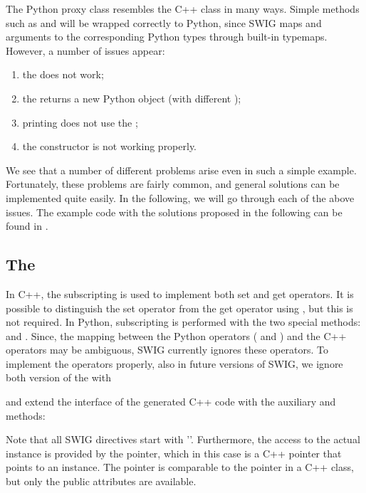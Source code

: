 The Python proxy class resembles the C++ class in many ways. Simple
methods such as  and  will be wrapped correctly
to Python, since SWIG maps  and  arguments to the
corresponding Python types through built-in typemaps.  However, a number
of issues appear:
\begin{enumerate}
\item the  does not work;

\item the  returns a new Python object (with different
);

\item printing does not use the ;

\item the  constructor is not working
properly.
\end{enumerate}
We see that a number of different problems arise even in such a simple
example. Fortunately, these problems are fairly common, and general
solutions can be implemented quite easily. In the following, we will go
through each of the above issues. The example code with the solutions
proposed in the following can be found in .

\subsection{The }
In C++, the subscripting  is used to implement
both set and get operators. It is possible to distinguish the set
operator from the get operator using , but this is not
required.  In Python, subscripting is performed with the two special
methods:  and .  Since,
the mapping between the Python operators ( and
) and the C++ operators  may be
ambiguous, SWIG currently ignores these operators.  To implement the
operators properly, also in future versions of SWIG, we ignore both
version of the  with
\begin{swigcode}
\end{swigcode}
and extend the interface of the generated C++ code with the auxiliary
 and  methods:
Note that all SWIG directives start with '\emp{\%}'.  Furthermore, the
access to the actual instance is provided by the  pointer,
which in this case is a C++ pointer that points to an 
instance. The pointer is comparable to the  pointer in a C++
class, but only the public attributes are available.

